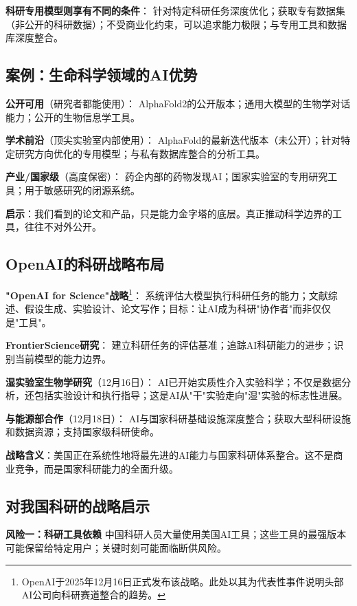 \textbf{科研专用模型则享有不同的条件}：
针对特定科研任务深度优化；获取专有数据集（非公开的科研数据）；不受商业化约束，可以追求能力极限；与专用工具和数据库深度整合。

\subsection{案例：生命科学领域的AI优势}

{\bfseries 公开可用}（研究者都能使用）：
AlphaFold2的公开版本；通用大模型的生物学对话能力；公开的生物信息学工具。

{\bfseries 学术前沿}（顶尖实验室内部使用）：
AlphaFold的最新迭代版本（未公开）；针对特定研究方向优化的专用模型；与私有数据库整合的分析工具。

{\bfseries 产业/国家级}（高度保密）：
药企内部的药物发现AI；国家实验室的专用研究工具；用于敏感研究的闭源系统。

\textbf{启示}：我们看到的论文和产品，只是能力金字塔的底层。真正推动科学边界的工具，往往不对外公开。

\subsection{OpenAI的科研战略布局}

{\bfseries "OpenAI for Science"战略}\footnote{OpenAI于2025年12月16日正式发布该战略。此处以其为代表性事件说明头部AI公司向科研赛道整合的趋势。}：
系统评估大模型执行科研任务的能力；文献综述、假设生成、实验设计、论文写作；目标：让AI成为科研"协作者"而非仅仅是"工具"。

\textbf{FrontierScience研究}：
建立科研任务的评估基准；追踪AI科研能力的进步；识别当前模型的能力边界。

\textbf{湿实验室生物学研究}（12月16日）：
AI已开始实质性介入实验科学；不仅是数据分析，还包括实验设计和执行指导；这是AI从"干"实验走向"湿"实验的标志性进展。

\textbf{与能源部合作}（12月18日）：
AI与国家科研基础设施深度整合；获取大型科研设施和数据资源；支持国家级科研使命。

\textbf{战略含义}：美国正在系统性地将最先进的AI能力与国家科研体系整合。这不是商业竞争，而是国家科研能力的全面升级。

\subsection{对我国科研的战略启示}

\textbf{风险一：科研工具依赖}
中国科研人员大量使用美国AI工具；这些工具的最强版本可能保留给特定用户；关键时刻可能面临断供风险。

